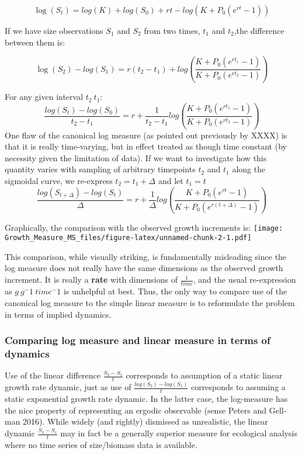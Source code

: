\documentclass[]{article}
\begin{document}
\[\log(S_t) = log(K) + log(S_0) + rt - log(K + P_0(e^{rt}-1))\]

If we have size observations \(S_1\) and \(S_2\) from two times, \(t_1\)
and \(t_2\),the difference between them is:

\[\log(S_2) - log(S_1) = r(t_2 - t_1) + log(\frac{K + P_0(e^{rt_1}-1)}{K + P_0(e^{rt_2}-1)})\]

For any given interval \(t_2~t_1\):\\
\[\frac{log(S_t) - log(S_0)}{t_2 - t_1} = r + \frac{1}{t_2-t_1}log(\frac{K + P_0(e^{rt_1}-1)}{K + P_0(e^{rt_2}-1)})\]
One flaw of the canonical log measure (as pointed out previously by
XXXX) is that it is really time-varying, but in effect treated as though
time constant (by necessity given the limitation of data). If we want to
investigate how this quantity varies with sampling of arbitrary
timepoints \(t_2\) and \(t_1\) along the sigmoidal curve, we re-express
\(t_2=t_1+\Delta\) and let \(t_1=t\)
\[\frac{log(S_{t+\Delta}) - log(S_t)}{\Delta} = r + \frac{1}{\Delta}log(\frac{K + P_0(e^{rt}-1)}{K + P_0(e^{r({t+\Delta})}-1)})\]

Graphically, the comparison with the observed growth increments is:
\texttt{[image: Growth\_Measure\_MS\_files/figure-latex/unnamed-chunk-2-1.pdf]}

This comparison, while visually striking, is fundamentally misleading
since the log measure does not really have the same dimensions as the
observed growth increment. It is really a \textbf{rate} with dimensions
of \(\frac{1}{time}\), and the usual re-expression as \(g~g^-1~time^-1\)
is unhelpful at best. Thus, the only way to compare use of the canonical
log measure to the simple linear measure is to reformulate the problem
in terms of implied dynamics.

\subsubsection{Comparing log measure and linear measure in terms of
dynamics}\label{comparing-log-measure-and-linear-measure-in-terms-of-dynamics}

Use of the linear difference \(\frac{S_2 - S_1}{t}\) corresponds to
assumption of a static linear growth rate dynamic, just as use of
\(\frac{log(S_2) - log(S_1)}{t}\) corresponds to assuming a static
exponential growth rate dynamic. In the latter case, the log-measure has
the nice property of representing an ergodic observable (sense Peters
and Gell-man 2016). While widely (and rightly) dismissed as unrealistic,
the linear dynamic \(\frac{S_2 - S_1}{t}\) may in fact be a generally
superior measure for ecological analysis where no time series of
size/biomass data is available.
\end{document}
